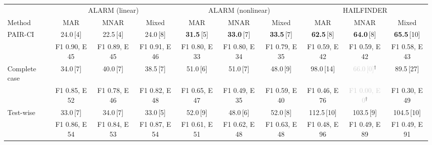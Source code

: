 \begin{tabular}{lccccccccc}
    \toprule
     & \multicolumn{3}{c}{ALARM (linear)} & \multicolumn{3}{c}{ALARM (nonlinear)} & \multicolumn{3}{c}{HAILFINDER} \\
    \cmidrule(lr){2-4} \cmidrule(lr){5-7} \cmidrule(lr){8-10}
    Method & MAR & MNAR & Mixed & MAR & MNAR & Mixed & MAR & MNAR & Mixed \\
    \midrule
    PAIR-CI                                       & 24.0\,{\scriptsize[4]} & 22.5\,{\scriptsize[4]} & 24.0\,{\scriptsize[8]} & \textbf{31.5}\,{\scriptsize[5]} & \textbf{33.0}\,{\scriptsize[7]} & \textbf{33.5}\,{\scriptsize[7]} & \textbf{62.5}\,{\scriptsize[8]} & \textbf{64.0}\,{\scriptsize[8]} & \textbf{65.5}\,{\scriptsize[10]} \\
                                                  & {\scriptsize F1 0.90, E 45} & {\scriptsize F1 0.89, E 45} & {\scriptsize F1 0.91, E 46} & {\scriptsize F1 0.80, E 33} & {\scriptsize F1 0.80, E 34} & {\scriptsize F1 0.79, E 35} & {\scriptsize F1 0.59, E 42} & {\scriptsize F1 0.59, E 42} & {\scriptsize F1 0.58, E 43} \\
    Complete case                                 & 34.0\,{\scriptsize[7]} & 40.0\,{\scriptsize[7]} & 38.5\,{\scriptsize[7]} & 51.0\,{\scriptsize[6]} & 51.0\,{\scriptsize[7]} & 48.0\,{\scriptsize[9]} & 98.0\,{\scriptsize[14]} & \textcolor{lightgray}{66.0\,{\scriptsize[0]}}$^\dagger$ & 89.5\,{\scriptsize[27]} \\
                                                  & {\scriptsize F1 0.85, E 52} & {\scriptsize F1 0.78, E 46} & {\scriptsize F1 0.82, E 48} & {\scriptsize F1 0.65, E 47} & {\scriptsize F1 0.49, E 35} & {\scriptsize F1 0.59, E 40} & {\scriptsize F1 0.46, E 76} & \textcolor{lightgray}{{\scriptsize F1 0.00, E 0}}$^\dagger$ & {\scriptsize F1 0.30, E 49} \\
    Test-wise                                     & 33.0\,{\scriptsize[7]} & 34.0\,{\scriptsize[7]} & 33.0\,{\scriptsize[5]} & 52.0\,{\scriptsize[9]} & 48.0\,{\scriptsize[6]} & 52.0\,{\scriptsize[8]} & 112.5\,{\scriptsize[10]} & 103.5\,{\scriptsize[9]} & 104.5\,{\scriptsize[10]} \\
                                                  & {\scriptsize F1 0.86, E 54} & {\scriptsize F1 0.84, E 53} & {\scriptsize F1 0.87, E 54} & {\scriptsize F1 0.61, E 51} & {\scriptsize F1 0.62, E 48} & {\scriptsize F1 0.63, E 48} & {\scriptsize F1 0.48, E 96} & {\scriptsize F1 0.49, E 89} & {\scriptsize F1 0.49, E 91} \\

\end{tabular}
